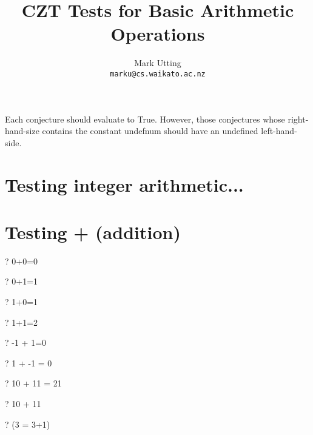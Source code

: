 \documentclass{article}
\title{CZT Tests for Basic Arithmetic Operations}
\author{Mark Utting \\ \texttt{marku@cs.waikato.ac.nz}}
\newcommand{\negate}{-}
\begin{document}
\maketitle

Each conjecture should evaluate to True.
However, those conjectures whose right-hand-size contains
the constant undefnum should have an undefined left-hand-side.


\section{Testing integer arithmetic...}

\section{Testing + (addition)}
\begin{zed} \vdash?   0+0=0 \end{zed}
\begin{zed} \vdash?   0+1=1 \end{zed}
\begin{zed} \vdash?   1+0=1 \end{zed}
\begin{zed} \vdash?   1+1=2 \end{zed}
\begin{zed} \vdash?   \negate 1 + 1=0 \end{zed}
\begin{zed} \vdash?   1 + \negate 1 = 0 \end{zed}
\begin{zed} \vdash?   10 + 11 = 21 \end{zed}
\begin{zed} \vdash?   10 + 11  \end{zed}
\begin{zed} \vdash?   \lnot (3 = 3+1) \end{zed}
\end{document}
